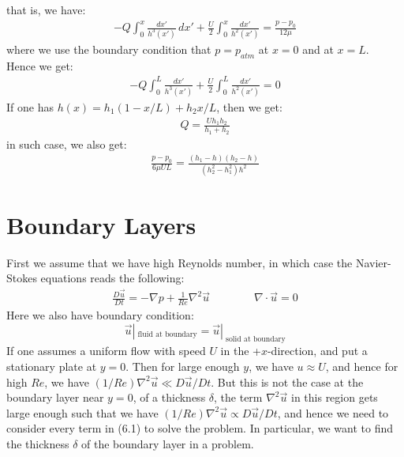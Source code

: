 \documentclass[11pt]{book}
\theoremstyle{break}
\theoremstyle{break}
\begin{document}
that is, we have:
\begin{align*}
-Q \int_0^x \frac{dx'}{h^3(x')}\, dx' + \frac{U}{2} \int_0^x \frac{dx'}{h^2(x')} = \frac{p-p_0}{12\mu}
\end{align*}
where we use the boundary condition that $p = p_{atm}$ at $x=0$ and at $x = L$. \\
Hence we get:
\begin{align*}
-Q \int_0^L \frac{dx'}{h^3(x')} + \frac{U}{2}\int_0^L \frac{dx'}{h^2(x')} = 0
\end{align*}
If one has $h(x) = h_1(1-x/L)+h_2x/L$, then we get:
\begin{align*}
Q = \frac{Uh_1h_2}{h_1 + h_2}
\end{align*}
in such case, we also get:
\begin{align*}
\frac{p-p_0}{6\mu UL} = \frac{(h_1 - h) (h_2 - h)}{(h_2^2-h_1^2)h^2}
\end{align*}

\chapter{Boundary Layers}
First we assume that we have high Reynolds number, in which case the Navier-Stokes equations reads the following:
\begin{align}
\frac{D\vec{u}}{Dt} = -\nabla p + \frac{1}{Re}\nabla^2 \vec{u} \qquad\qquad \nabla \cdot \vec{u} = 0
\end{align}
Here we also have boundary condition: 
$$\vec{u}|_{\text{ fluid at boundary}}=\vec{u}|_{\text{ solid at boundary}}$$
If one assumes a uniform flow with speed $U$ in the +$x$-direction, and put a stationary plate at $y = 0$. Then for large enough $y$, we have $u \approx U$, and hence for high $Re$, we have $(1/Re)\nabla^2 \vec{u} \ll {D\vec{u}}/{Dt}$. But this is not the case at the boundary layer near $y=0$, of a thickness $\delta$, the term $\nabla^2 \vec{u}$ in this region gets large enough such that we have $(1/Re)\nabla^2 \vec{u}\propto D\vec{u}/Dt$, and hence we need to consider every term in (6.1) to solve the problem. In particular, we want to find the thickness $\delta$ of the boundary layer in a problem. \\ 
\end{document}
